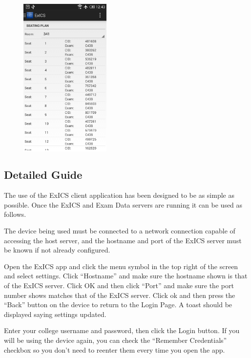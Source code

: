 \begin{enumerate}
\begin{figure}[!htbp]
	\centering
	\includegraphics[width=0.4\textwidth]{"screenshots/User guide/11"}
\end{figure}

\FloatBarrier
\end{enumerate}

\subsection{Detailed Guide}
\label{subs:detail}

The use of the ExICS client application has been designed to be as simple as possible.  Once the ExICS and Exam Data servers are running it can be used as follows.

The device being used must be connected to a network connection capable of accessing the host server, and the hostname and port of the ExICS server must be known if not already configured.

Open the ExICS app and click the menu symbol in the top right of the screen and select settings.  Click ``Hostname'' and make sure the hostname shown is that of the ExICS server.  Click OK and then click ``Port'' and make sure the port number shows matches that of the ExICS server.  Click ok and then press the ``Back'' button on the device to return to the Login Page.  A toast should be displayed saying settings updated.

Enter your college username and password, then click the Login button.  If you will be using the device again, you can check the ``Remember Credentials'' checkbox so you don't need to reenter them every time you open the app.

